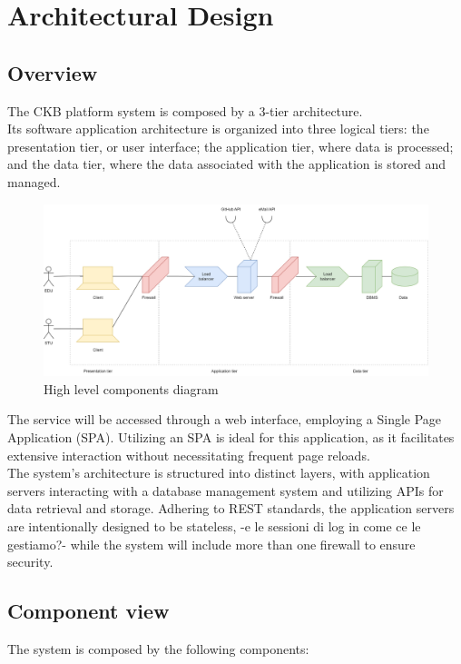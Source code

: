 \chapter{Architectural Design}

\section{Overview}
The CKB platform system is composed by a 3-tier architecture.\\
Its software application architecture is organized into three logical tiers: the presentation tier, or user interface; the application tier, where data is processed; and the data tier, where the data associated with the application is stored and managed.

\begin{figure}[H]
    \centering
    \includegraphics[width=\textwidth]{images/diagrams/high_level_diagram.png}
    \caption{High level components diagram}
\end{figure}

The service will be accessed through a web interface, employing a Single Page Application (SPA). Utilizing an SPA is ideal for this application, as it facilitates extensive interaction without necessitating frequent page reloads.\\
The system's architecture is structured into distinct layers, with application servers interacting with a database management system and utilizing APIs for data retrieval and storage. {\color{red}Adhering to REST standards, the application servers are intentionally designed to be stateless, -e le sessioni di log in come ce le gestiamo?-} while the system will include more than one firewall to ensure security.\\

\section{Component view}
The system is composed by the following components:

